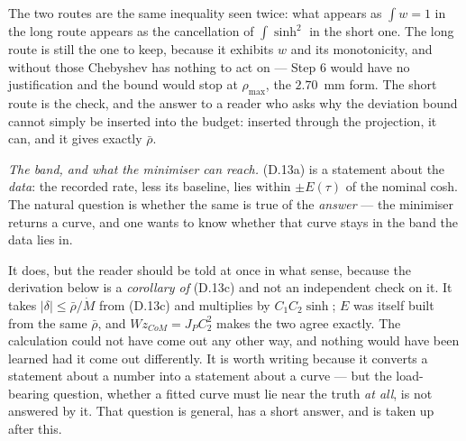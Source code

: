 \documentclass[11pt]{article}
\newcommand{\Wz}{W\!z_{CoM}}
\newcommand{\rmax}{\rho_{\max}}
\newcommand{\rbar}{\bar\rho}
\begin{document}
The two routes are the same inequality seen twice: what appears as
$\int w = 1$ in the long route appears as the cancellation of
$\int\sinh^2$ in the short one. The long route is still the one to
keep, because it exhibits $w$ and its monotonicity, and without those
Chebyshev has nothing to act on --- Step 6 would have no justification
and the bound would stop at $\rmax$, the $2.70$~mm form. The short route
is the check, and the answer to a reader who asks why the deviation
bound cannot simply be inserted into the budget: inserted through the
projection, it can, and it gives exactly $\rbar$.

\emph{The band, and what the minimiser can reach.} (D.13a) is a
statement about the \emph{data}: the recorded rate, less its baseline,
lies within $\pm E(\tau)$ of the nominal cosh. The natural question is
whether the same is true of the \emph{answer} --- the minimiser returns
a curve, and one wants to know whether that curve stays in the band the
data lies in.

It does, but the reader should be told at once in what sense, because
the derivation below is a \emph{corollary of} (D.13c) and not an
independent check on it. It takes $|\delta| \le \rbar/\dot M$ from
(D.13c) and multiplies by $C_1C_2\sinh$; $E$ was itself built from the
same $\rbar$, and $\Wz = J_PC_2^{2}$ makes the two agree exactly. The
calculation could not have come out any other way, and nothing would
have been learned had it come out differently. It is worth writing
because it converts a statement about a number into a statement about a
curve --- but the load-bearing question, whether a fitted curve must lie
near the truth \emph{at all}, is not answered by it. That question is
general, has a short answer, and is taken up after this.
\end{document}
